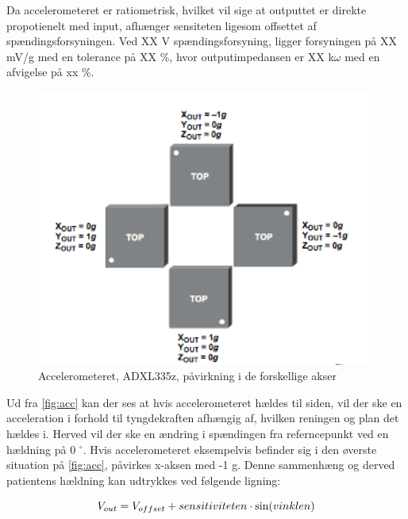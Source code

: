 Da accelerometeret er ratiometrisk, hvilket vil sige at outputtet er direkte propotienelt med input, afhænger sensiteten ligesom offsettet af spændingsforsyningen. Ved XX V spændingsforsyning, ligger forsyningen på XX mV/g med en tolerance på XX \%, hvor outputimpedansen er XX k$\omega$ med en afvigelse på xx \%. 

\begin{figure}[H]
\centering
\includegraphics[width=1\textwidth]{figures/acc.png}
\caption{Accelerometeret, ADXL335z, påvirkning i de forskellige akser}
\label{fig:acc}
\end{figure}

\noindent
Ud fra \autoref{fig:acc} kan der ses at hvis accelerometeret hældes til siden, vil der ske en acceleration i forhold til tyngdekraften afhængig af, hvilken reningen og plan det hældes i. Herved vil der ske en ændring i spændingen fra referncepunkt ved en hældning på 0 $^{\circ}$. Hvis accelerometeret eksempelvis befinder sig i den øverste situation på \autoref{fig:acc}, påvirkes x-aksen med -1 g. Denne sammenhæng og derved patientens hældning kan udtrykkes ved følgende ligning:

\begin{equation}
	V_{out} = V_{offset} + sensitiviteten \cdot \sin(vinklen) \\
\end{equation}


